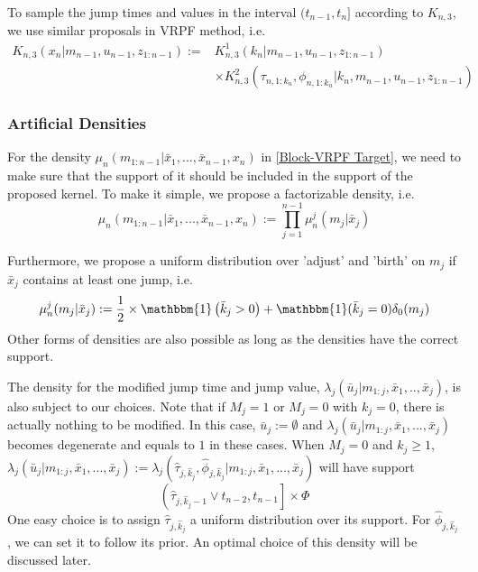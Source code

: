 \documentclass[12pt,a4paper]{article}
\begin{document}
To sample the jump times and values in the interval $(t_{n-1},t_n]$ according to $K_{n,3}$, we use similar proposals in VRPF method, i.e. 
\begin{equation}
\label{BlockVRPF-ProposedX}
\begin{split}
K_{n,3}\left(x_n|m_{n-1},u_{n-1},z_{1:n-1}\right):=& K_{n,3}^{1}\left(k_n|m_{n-1},u_{n-1},z_{1:n-1}\right)\\
& \times K_{n,3}^{2}\left(\tau_{n,1:k_n},\phi_{n,1:k_n}|k_n,m_{n-1},u_{n-1},z_{1:n-1}\right)
\end{split}
\end{equation}

\subsubsection{Artificial Densities}
For the density $\mu_n\left(m_{1:n-1}|\bar{x}_{1},...,\bar{x}_{n-1},x_n\right)$ in \eqref{Block-VRPF Target}, we need to make sure that the support of it should be included in the support of the proposed kernel. To make it simple, we propose a factorizable density, i.e.
\begin{equation*}
    \mu_n\left(m_{1:n-1}|\bar{x}_{1},...,\bar{x}_{n-1},x_{n}\right) := \prod_{j=1}^{n-1} \mu_{n}^{j}\left(m_j|\bar{x}_{j}\right)
\end{equation*}

Furthermore, we propose a uniform distribution over 'adjust' and 'birth' on $m_{j}$ if $\bar{x}_{j}$ contains at least one jump, i.e.
$$\mu_n^j(m_j|\bar{x}_j) := \frac{1}{2}\times \mathbbm{1}\left(\bar{k}_j > 0\right) + \mathbbm{1}(\bar{k}_j=0)\delta_{0}(m_j)$$
Other forms of densities are also possible as long as the densities have the correct support. 

The density for the modified jump time and jump value, $\lambda_{j}\left(\bar{u}_{j}|m_{1:j},\bar{x}_1,..,\bar{x}_j\right)$, is also subject to our choices. Note that if $M_{j} = 1$ or $M_{j}=0$ with $k_{j}=0$, there is actually nothing to be modified. In this case, $\bar{u}_{j} := \emptyset$ and  $\lambda_{j}\left(\bar{u}_{j}|m_{1:j},\bar{x}_1,...,\bar{x}_j\right)$ becomes degenerate and equals to $1$ in these cases. When $M_{j}=0$ and $k_{j} \geq 1$, $\lambda_{j}\left(\bar{u}_{j}|m_{1:j},\bar{x}_1,...,\bar{x}_j\right) := \lambda_{j}\left(\hat{\tau}_{j,\hat{k}_{j}},\hat{\phi}_{j,\hat{k}_{j}}|m_{1:j},\bar{x}_1,...,\bar{x}_j\right)$ will have support 
$$\left(\hat{\tau}_{j,\hat{k}_{j}-1} \vee t_{n-2},t_{n-1}\right] \times \Phi$$
One easy choice is to assign $\hat{\tau}_{j,\hat{k}_{j}}$ a uniform distribution over its support. For $\hat{\phi}_{j,\hat{k}_{j}}$, we can set it to follow its prior. An optimal choice of this density will be discussed later. 
\end{document}
